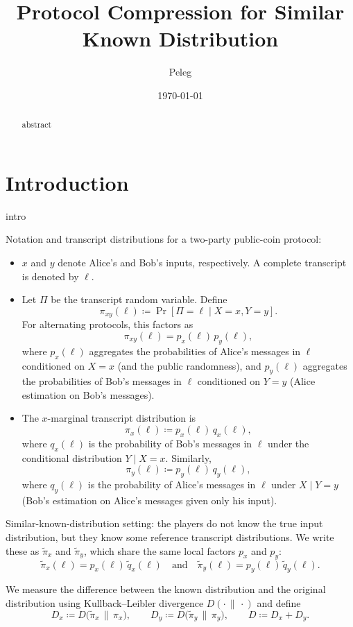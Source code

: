 \documentclass[11pt]{article}
\title{Protocol Compression for Similar Known Distribution}
\author{Peleg}
\date{\today}
\begin{document}
\maketitle

\begin{abstract}
abstract 
\end{abstract}

\section{Introduction}
intro

\begin{definition}
Notation and transcript distributions for a two-party public-coin protocol:
\begin{itemize}[leftmargin=*, itemsep=2pt]
  \item $x$ and $y$ denote Alice's and Bob's inputs, respectively. A complete transcript is denoted by $\ell$.
  \item Let $\Pi$ be the transcript random variable. Define
  \[
    \pi_{xy}(\ell) \coloneqq \Pr[\Pi=\ell \mid X=x, Y=y].
  \]
  For alternating protocols, this factors as
  \[
    \pi_{xy}(\ell) = p_x(\ell)\, p_y(\ell),
  \]
  where $p_x(\ell)$ aggregates the probabilities of Alice's messages in $\ell$ conditioned on $X=x$ (and the public randomness), and $p_y(\ell)$ aggregates the probabilities of Bob's messages in $\ell$ conditioned on $Y=y$ (Alice estimation on Bob's messages).
  \item The $x$-marginal transcript distribution is
  \[
    \pi_x(\ell) \coloneqq p_x(\ell)\, q_x(\ell),
  \]
  where $q_x(\ell)$ is the probability of Bob's messages in $\ell$ under the conditional distribution $Y\mid X=x$. Similarly,
  \[
    \pi_y(\ell) \coloneqq p_y(\ell)\, q_y(\ell),
  \]
  where $q_y(\ell)$ is the probability of Alice's messages in $\ell$ under $X\mid Y=y$ (Bob's estimation on Alice's messages given only his input).
\end{itemize}

Similar-known-distribution setting: the players do not know the true input distribution, but they know some reference transcript distributions. We write these as $\tilde{\pi}_x$ and $\tilde{\pi}_y$, which share the same local factors $p_x$ and $p_y$:
\[
  \tilde{\pi}_x(\ell) = p_x(\ell)\, \tilde{q}_x(\ell)
  \quad\text{and}\quad
  \tilde{\pi}_y(\ell) = p_y(\ell)\, \tilde{q}_y(\ell).
\]

We measure the difference between the known distribution and the original distribution using Kullback--Leibler divergence $D(\cdot\,\|\,\cdot)$ and define
\[
  D_x \coloneqq D\big(\tilde{\pi}_x \,\|\, \pi_x\big),\qquad
  D_y \coloneqq D\big(\tilde{\pi}_y \,\|\, \pi_y\big),\qquad
  D \coloneqq D_x + D_y.
\]
\end{definition}
\end{document}
